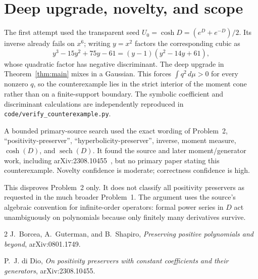 \documentclass[11pt,a4paper]{article}
\begin{document}
\section{Deep upgrade, novelty, and scope}

The first attempt used the transparent seed
$U_0=\cosh D=(e^D+e^{-D})/2$.  Its inverse already fails on $x^6$; writing
$y=x^2$ factors the corresponding cubic as
\[
 y^3-15y^2+75y-61=(y-1)(y^2-14y+61),
\]
whose quadratic factor has negative discriminant.  The deep upgrade in
Theorem~\ref{thm:main} mixes in a Gaussian.  This forces
$\int q^2\,d\mu>0$ for every nonzero $q$, so the counterexample lies in the
strict interior of the moment cone rather than on a finite-support boundary.
The symbolic coefficient and discriminant calculations are independently
reproduced in \texttt{code/verify\_counterexample.py}.

A bounded primary-source search used the exact wording of Problem~2,
``positivity-preserver'', ``hyperbolicity-preserver'', inverse, moment
measure, $\cosh(D)$, and $\operatorname{sech}(D)$.  It found the source and
later moment/generator work, including arXiv:2308.10455~\cite{Dio}, but no
primary paper stating this counterexample.  Novelty confidence is moderate;
correctness confidence is high.

This disproves Problem~2 only.  It does not classify all positivity
preservers as requested in the much broader Problem~1.  The argument uses
the source's algebraic convention for infinite-order operators: formal power
series in $D$ act unambiguously on polynomials because only finitely many
derivatives survive.

\begin{thebibliography}{2}
J.~Borcea, A.~Guterman, and B.~Shapiro,
\emph{Preserving positive polynomials and beyond}, arXiv:0801.1749.

P.~J. di Dio,
\emph{On positivity preservers with constant coefficients and their
generators}, arXiv:2308.10455.
\end{thebibliography}
\end{document}
